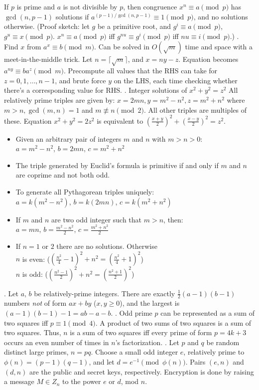 If $p$ is prime and $a$ is not divisible by $p$, then congruence
$x^n \equiv a \pmod{p}$ has $\gcd(n, p-1)$ solutions if
$a^{(p-1)/\gcd(n,p-1)} \equiv 1 \pmod{p}$, and no solutions otherwise.
(Proof sketch: let $g$ be a primitive root, and
$g^i \equiv a \pmod{p}$, $g^u \equiv x \pmod{p}$.
$x^n \equiv a \pmod{p}$ iff $g^{nu} \equiv g^i \pmod{p}$ iff $nu \equiv i \pmod{p}$.) \TopicBreak
{}.  Find $x$ from $a^x \equiv b \pmod{m}$.
Can be solved in $O(\sqrt{m})$ time and space with a meet-in-the-middle trick.
Let $n = \lceil \sqrt{m} \rceil$, and $x = ny - z$.
Equation becomes $a^{ny} \equiv b a^z \pmod{m}$.  Precompute all values that
the RHS can take for $z = 0, 1, \dots, n-1$, and brute force $y$ on the LHS,
each time checking whether there's a corresponding value for RHS. \TopicBreak
{}.  Integer solutions of $x^2 + y^2 = z^2$
All relatively prime triples are given by:
$x=2mn, y=m^2-n^2, z=m^2+n^2$ where $m>n, \gcd(m,n)=1$ and $m \not\equiv n \pmod{2}$.
All other triples are multiples of these.
Equation $x^2 + y^2 = 2z^2$ is equivalent to $(\frac{x+y}{2})^2 + (\frac{x-y}{2})^2 = z^2$.
\begin{itemize}
\item Given an arbitrary pair of integers $m$ and $n$ with $m > n > 0$:\\
$a = m^2 - n^2$, $b = 2mn$, $c = m^2 + n^2$
\item The triple generated by Euclid's formula is primitive if and only if $m$ and $n$ are coprime and not both odd.
\item To generate all Pythagorean triples uniquely:\\
$a = k (m^2 - n^2)$, $b = k(2mn)$, $c = k(m^2 + n^2)$
\item If $m$ and $n$ are two odd integer such that $m > n$, then:\\
$a = mn$, $b = \frac{m^2 - n^2}{2}$, $c = \frac{m^2 + n^2}{2}$
\item If $n=1$ or $2$ there are no solutions. Otherwise\\
$n$ is even: ($(\frac{n^2}{4} - 1)^2 + n^2 = (\frac{n^2}{4} + 1)^2$)\\
$n$ is odd: ($(\frac{n^2 - 1}{2})^2 + n^2 = (\frac{n^2 + 1}{2})^2$)
\end{itemize}
.  Let $a$, $b$ be relatively-prime integers.
There are exactly $\frac{1}{2}(a-1)(b-1)$ numbers \emph{not} of form $ax+by$ ($x,y \ge 0$),
and the largest is $(a-1)(b-1)-1 = ab - a - b$. \TopicBreak
{}.  Odd prime $p$ can be represented
as a sum of two squares iff $p \equiv 1 {\pmod 4}$.
A product of two sums of two squares is a sum of two squares.
Thus, $n$ is a sum of two squares iff every prime of
form $p=4k+3$ occurs an even number of times in $n$'s factorization. \TopicBreak
{}. Let $p$ and $q$ be random distinct large primes, $n = pq$.
Choose a small odd integer $e$, relatively prime to $\phi(n) = (p-1)(q-1)$,
and let $d = e^{-1} \pmod{\phi(n)}$. Pairs $(e,n)$ and $(d,n)$ are
the public and secret keys, respectively.
Encryption is done by raising a message $M \in Z_n$ to the power $e$ or $d$,
mod $n$.


